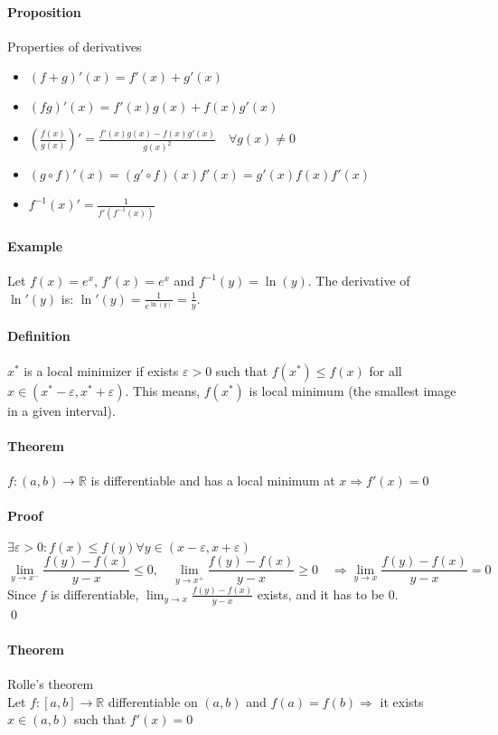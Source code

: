\documentclass{article}
\newcommand{\DS}{\displaystyle}
\newcommand{\functoR}[2]{#1 : #2 \rightarrow \mathbb{R}}
\newcommand{\intcc}[1]{\left[#1\right]}
\newcommand{\intoo}[1]{\left(#1\right)}
\newcommand{\Ep}{\varepsilon}
\newcommand{\Def}{\paragraph{Definition}}
\newcommand{\Proposition}{\paragraph{Proposition}}
\newcommand{\Theorem}{\paragraph{Theorem}}
\newcommand{\Proof}{\paragraph{Proof}}
\newcommand{\Example}{\paragraph{Example}}
\begin{document}
	\Proposition Properties of derivatives
	\begin{itemize}
		\item $(f + g)'(x) = f'(x) + g'(x)$
		\item $(fg)'(x) = f'(x)g(x) + f(x)g'(x)$
		\item $(\frac{f(x)}{g(x)})' = \frac{f'(x)g(x)-f(x)g'(x)}{g(x)^2}
		\quad \forall g(x) \neq 0$
		\item $(g \circ f)'(x) = (g' \circ f)(x)f'(x) = g'(x)f(x)f'(x)$
		\item $f^{-1}(x)' = \frac{1}{f'(f^{-1}(x))}$
	\end{itemize}

	\Example Let $f(x) = e^x$, $f'(x) = e^x$ and $f^{-1}(y) = \ln(y)$. The
	derivative of $\ln'(y)$ is: $\ln'(y) = \frac{1}{e^{\ln(y)}} = \frac{1}{y}$.

	\Def $x^*$ is a local minimizer if exists $\Ep > 0$ such that $f(x^*) \leq
	f(x)$ for all $x \in \intoo{x^*-\Ep, x^*+\Ep}$. This means, $f(x^*)$ is local
	minimum (the smallest image in a given interval).

	\Theorem $\functoR{f}{\intoo{a,b}}$ is differentiable and has a local minimum
	at $x \Rightarrow f'(x) = 0$

	\Proof $\exists \Ep > 0 : f(x) \leq f(y) \forall y \in \intoo{x-\Ep,x+\Ep}$
	\begin{equation*}
		\lim_{y \to x^-} \frac{f(y)-f(x)}{y-x} \leq 0, \quad
		\lim_{y \to x^+} \frac{f(y)-f(x)}{y-x} \geq 0 \quad \Rightarrow
		\lim_{y \to x} \frac{f(y)-f(x)}{y-x} = 0
	\end{equation*}
	Since $f$ is differentiable, $\DS \lim_{y \to x}\frac{f(y)-f(x)}{y-x}$ exists,
	and it has to be 0.
\\\qed

	\Theorem Rolle's theorem
\\Let $\functoR{f}{\intcc{a,b}}$ differentiable on $\intoo{a,b}$ and $f(a) =
	f(b) \Rightarrow$ it exists $x \in \intoo{a,b}$ such that $f'(x) = 0$
\end{document}
